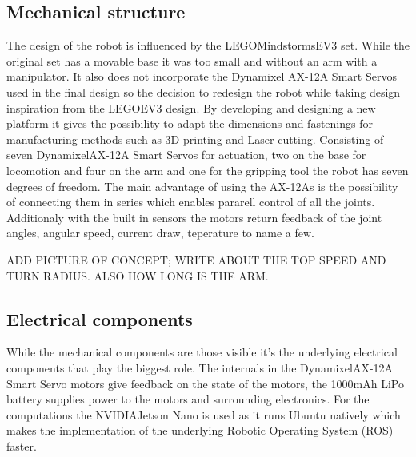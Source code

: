 
\subsection{Mechanical structure}
The design of the robot is influenced by the LEGO\textregistered Mindstorms\textregistered EV3 set. While the original set has a movable base it was too small and without an arm with a manipulator. It also does not incorporate the Dynamixel AX-12A Smart Servos used in the final design so the decision to redesign the robot while taking design inspiration from the LEGO\textregistered EV3 design. By developing and designing a new platform it gives the possibility to adapt the dimensions and fastenings for manufacturing methods such as 3D-printing and Laser cutting. 
Consisting of seven Dynamixel\textregistered AX-12A Smart Servos for actuation, two on the base for locomotion and four on the arm and one for the gripping tool the robot has seven degrees of freedom. The main advantage of using the AX-12As is the possibility of connecting them in series which enables pararell control of all the joints. Additionaly with the built in sensors the motors return feedback of the joint angles, angular speed, current draw, teperature to name a few. 

ADD PICTURE OF CONCEPT; WRITE ABOUT THE TOP SPEED AND TURN RADIUS. ALSO HOW LONG IS THE ARM.

\subsection{Electrical components}
While the mechanical components are those visible it's the underlying electrical components that play the biggest role. The internals in the Dynamixel\textregistered AX-12A Smart Servo motors give feedback on the state of the motors, the 1000mAh LiPo battery supplies power to the motors and surrounding electronics. For the computations the NVIDIA\textregistered Jetson Nano is used as it runs Ubuntu natively which makes the implementation of the underlying Robotic Operating System (ROS) \cite{ros} faster. 





